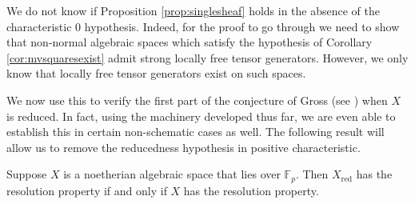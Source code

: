 \documentclass[12pt]{amsart}
\begin{document}
\begin{Remark} We do not know if Proposition \ref{prop:singlesheaf} holds in the absence of the characteristic $0$ hypothesis. Indeed, for the proof to go through we need to show that non-normal algebraic spaces which satisfy the hypothesis of Corollary \ref{cor:mvsquaresexist} admit strong locally free tensor generators. However, we only know that locally free tensor generators exist on such spaces. \end{Remark}

We now use this to verify the first part of the conjecture of Gross (see \cite[Conj. 2.0.3]{Grossthesis}) when $X$ is reduced. In fact, using the machinery developed thus far, we are even able to establish this in certain non-schematic cases as well. The following result will allow us to remove the reducedness hypothesis in positive characteristic.

\begin{proposition} \label{positivechar} Suppose $X$ is a noetherian algebraic space that lies over $\mathbb{F}_p$. Then $X_{\mathrm{red}}$ has the resolution property if and only if $X$ has the resolution property. \end{proposition}
\end{document}
